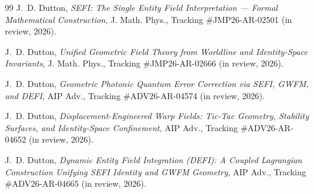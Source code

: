 \documentclass[11pt,a4paper]{article}
\begin{document}
\begin{thebibliography}{99}
J.~D. Dutton, \emph{SEFI: The Single Entity Field Interpretation --- Formal Mathematical Construction}, J. Math. Phys., Tracking \#JMP26-AR-02501 (in review, 2026).

J.~D. Dutton, \emph{Unified Geometric Field Theory from Worldline and Identity-Space Invariants}, J. Math. Phys., Tracking \#JMP26-AR-02666 (in review, 2026).

J.~D. Dutton, \emph{Geometric Photonic Quantum Error Correction via SEFI, GWFM, and DEFI}, AIP Adv., Tracking \#ADV26-AR-04574 (in review, 2026).

J.~D. Dutton, \emph{Displacement-Engineered Warp Fields: Tic-Tac Geometry, Stability Surfaces, and Identity-Space Confinement}, AIP Adv., Tracking \#ADV26-AR-04652 (in review, 2026).

J.~D. Dutton, \emph{Dynamic Entity Field Integration (DEFI): A Coupled Lagrangian Construction Unifying SEFI Identity and GWFM Geometry}, AIP Adv., Tracking \#ADV26-AR-04665 (in review, 2026).

\end{thebibliography}
\end{document}
